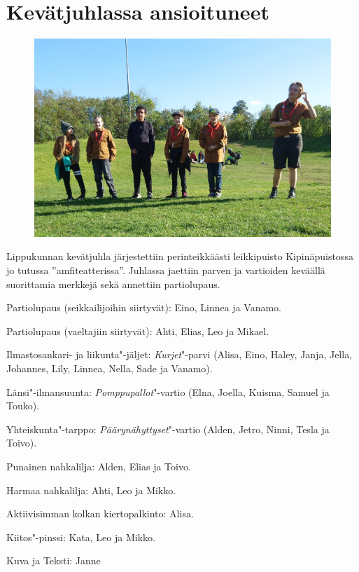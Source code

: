 \section{Kevätjuhlassa ansioituneet}

\begin{figure}[!b]
\centering\includegraphics[width=\textwidth]{assets/kevatjuhla}
\end{figure}

\begin{multicols}{2}
\noindent Lippukunnan kevätjuhla järjestettiin perinteikkäästi leikkipuisto Kipinäpuistossa jo tutussa ''amfiteatterissa''. Juhlassa jaettiin parven ja vartioiden keväällä suorittamia merkkejä sekä annettiin partiolupaus.

Partiolupaus (seikkailijoihin siirtyvät): Eino, Linnea ja Vanamo.

Partiolupaus (vaeltajiin siirtyvät): Ahti, Elias, Leo ja Mikael. 

Ilmastosankari- ja liikunta"-jäljet: \textit{Kurjet}"-parvi (Alisa, Eino, Haley, Janja, Jella, Johannes, Lily, Linnea, Nella, Sade ja Vanamo).

Länsi"-ilmansuunta: \textit{Pomppupallot}"-vartio (Elna, Joella, Kuisma, Samuel ja Touko).

Yhteiskunta"-tarppo: \textit{Päärynähyttyset}"-vartio (Alden, Jetro, Ninni, Tesla ja Toivo).

Punainen nahkalilja: Alden, Elias ja Toivo.

Harmaa nahkalilja: Ahti, Leo ja Mikko.

Aktiivisimman kolkan kiertopalkinto: Alisa.

Kiitos"-pinssi: Kata, Leo ja Mikko.
\end{multicols}

\medskip

\noindent\null\hfill Kuva ja Teksti: Janne 
